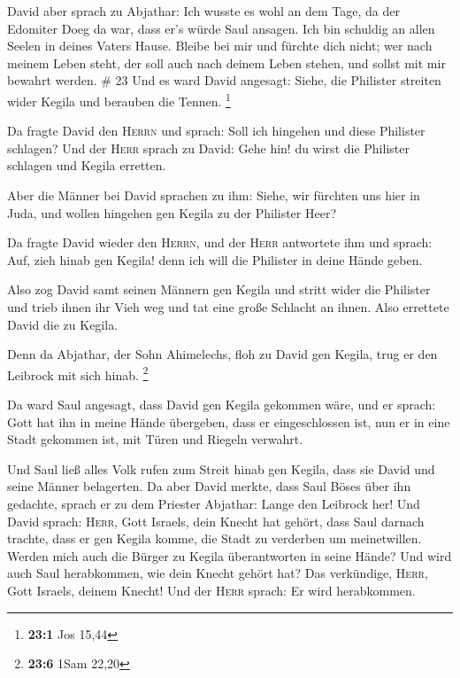  David aber sprach zu Abjathar: Ich wusste es wohl an dem
Tage, da der Edomiter Doeg da war, dass er's würde Saul ansagen. Ich bin
schuldig an allen Seelen in deines Vaters Hause.  Bleibe
bei mir und fürchte dich nicht; wer nach meinem Leben steht, der soll
auch nach deinem Leben stehen, und sollst mit mir bewahrt werden. \# 23
 Und es ward David angesagt: Siehe, die Philister streiten
wider Kegila und berauben die Tennen. \footnote{\textbf{23:1} Jos 15,44}

 Da fragte David den \textsc{Herrn} und sprach: Soll ich
hingehen und diese Philister schlagen? Und der \textsc{Herr} sprach zu
David: Gehe hin! du wirst die Philister schlagen und Kegila erretten.

 Aber die Männer bei David sprachen zu ihm: Siehe, wir
fürchten uns hier in Juda, und wollen hingehen gen Kegila zu der
Philister Heer?

 Da fragte David wieder den \textsc{Herrn}, und der
\textsc{Herr} antwortete ihm und sprach: Auf, zieh hinab gen Kegila!
denn ich will die Philister in deine Hände geben.

 Also zog David samt seinen Männern gen Kegila und stritt
wider die Philister und trieb ihnen ihr Vieh weg und tat eine große
Schlacht an ihnen. Also errettete David die zu Kegila.

 Denn da Abjathar, der Sohn Ahimelechs, floh zu David gen
Kegila, trug er den Leibrock mit sich hinab. \footnote{\textbf{23:6}
  1Sam 22,20}

 Da ward Saul angesagt, dass David gen Kegila gekommen
wäre, und er sprach: Gott hat ihn in meine Hände übergeben, dass er
eingeschlossen ist, nun er in eine Stadt gekommen ist, mit Türen und
Riegeln verwahrt.

 Und Saul ließ alles Volk rufen zum Streit hinab gen
Kegila, dass sie David und seine Männer belagerten.  Da
aber David merkte, dass Saul Böses über ihn gedachte, sprach er zu dem
Priester Abjathar: Lange den Leibrock her!  Und David
sprach: \textsc{Herr}, Gott Israels, dein Knecht hat gehört, dass Saul
darnach trachte, dass er gen Kegila komme, die Stadt zu verderben um
meinetwillen.  Werden mich auch die Bürger zu Kegila
überantworten in seine Hände? Und wird auch Saul herabkommen, wie dein
Knecht gehört hat? Das verkündige, \textsc{Herr}, Gott Israels, deinem
Knecht! Und der \textsc{Herr} sprach: Er wird herabkommen.

